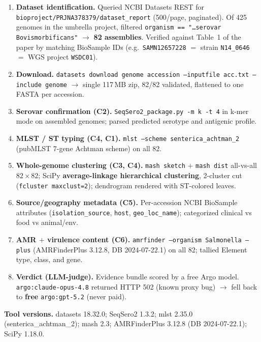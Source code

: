 \documentclass[11pt]{article}
\begin{document}
\begin{enumerate}
\item \textbf{Dataset identification.} Queried NCBI Datasets REST for \texttt{bioproject/PRJNA378379/dataset\_report} (500/page, paginated). Of 425 genomes in the umbrella project, filtered \texttt{organism == "\ldots serovar Bovismorbificans"} $\rightarrow$ \textbf{82 assemblies}. Verified against Table~1 of the paper by matching BioSample IDs (e.g.\ \texttt{SAMN12657228} $=$ strain \texttt{N14\_0646} $=$ WGS project \texttt{WSDC01}).

\item \textbf{Download.} \texttt{datasets download genome accession --inputfile acc.txt --include genome} $\rightarrow$ single 117\,MB zip, 82/82 validated, flattened to one FASTA per accession.

\item \textbf{Serovar confirmation (C2).} \texttt{SeqSero2\_package.py -m k -t 4} in k-mer mode on assembled genomes; parsed predicted serotype and antigenic profile.

\item \textbf{MLST / ST typing (C4, C1).} \texttt{mlst --scheme senterica\_achtman\_2} (pubMLST 7-gene Achtman scheme) on all 82.

\item \textbf{Whole-genome clustering (C3, C4).} \texttt{mash sketch} $+$ \texttt{mash dist} all-vs-all $82\times 82$; SciPy \textbf{average-linkage hierarchical clustering}, 2-cluster cut (\texttt{fcluster maxclust=2}); dendrogram rendered with ST-colored leaves.

\item \textbf{Source/geography metadata (C5).} Per-accession NCBI BioSample attributes (\texttt{isolation\_source}, \texttt{host}, \texttt{geo\_loc\_name}); categorized clinical vs food vs animal/env.

\item \textbf{AMR $+$ virulence content (C6).} \texttt{amrfinder --organism Salmonella --plus} (AMRFinderPlus 3.12.8, DB 2024-07-22.1) on all 82; tallied Element type, class, and gene.

\item \textbf{Verdict (LLM-judge).} Evidence bundle scored by a free Argo model. \texttt{argo:claude-opus-4.8} returned HTTP 502 (known proxy bug) $\rightarrow$ fell back to \textbf{free} \texttt{argo:gpt-5.2} (never paid).
\end{enumerate}

\textbf{Tool versions.} datasets 18.32.0; SeqSero2 1.3.2; mlst 2.35.0 (senterica\_achtman\_2); mash 2.3; AMRFinderPlus 3.12.8 (DB 2024-07-22.1); SciPy 1.18.0.
\end{document}

